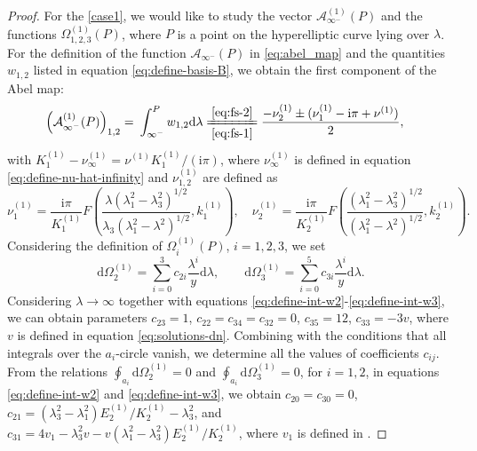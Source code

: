 \documentclass[11pt,reqno]{amsart}
\newcommand{\ii}{\mathrm{i}}
\newcommand{\dd}{\mathrm{d}}
\numberwithin{equation}{section}
\begin{document}
\begin{proof}
	For the \ref{case1}, we would like to study the vector $\mathcal{A}_{\infty^{-}}^{(1)}(P)$ and the functions $\Omega_{1,2,3}^{(1)}(P)$, where $P$ is a point on the hyperelliptic curve lying over $\lambda$.
	For the definition of the function $\mathcal{A}_{\infty^{-}}(P)$ in \eqref{eq:abel_map} and the quantities $w_{1,2}$ listed in equation \eqref{eq:define-basis-B}, we obtain the first component of the Abel map:
	\begin{equation}\label{eq:define-AP-P}
		\begin{split}
			\left(\mathcal{A}^{(1)}_{\infty^{-}}(P)\right)_{1,2}=&\ \int_{\infty^{-}}^P w_{1,2} \dd \lambda 
			\xlongequal[\eqref{eq:fs-1}]{\eqref{eq:fs-2}}
			\frac{ -\nu^{(1)} _2\pm(\nu^{(1)} _1-\ii\pi+ \nu^{(1)}) }{2},
		\end{split}
	\end{equation}
	with $K^{(1)}_1-\nu^{(1)}_{\infty}= \nu^{(1)} K^{(1)}_1/(\ii \pi)$,
	where $ \nu^{(1)} _{\infty}$ is defined in equation \eqref{eq:define-nu-hat-infinity} and $ \nu^{(1)} _{1,2}$ are defined as 
	\begin{equation}\label{eq:define-nu-1-12}\nonumber
		\nu^{(1)} _1=\frac{\ii\pi }{  K^{(1)}_1} F\left(\frac{\lambda(\lambda_1^2-\lambda_3^2)^{1/2}}{\lambda_3(\lambda_1^2-\lambda^2)^{1/2}},  k^{(1)}_1\right), \quad 
		\nu^{(1)} _2=\frac{\ii \pi }{  K^{(1)}_2} F\left(\frac{(\lambda_1^2-\lambda_3^2)^{1/2}}{(\lambda_1^2-\lambda^2)^{1/2}},  k^{(1)}_2\right).
	\end{equation}
	Considering the definition of $\Omega_{i}^{(1)}(P)$, $i=1,2,3$, we set 
	\begin{equation}\label{eq:define-Omega-23-c}
		\dd\Omega_2^{(1)}=\sum_{i=0}^3c_{2i}\frac{\lambda^i}{y}\dd \lambda,
		\qquad 
		\dd\Omega_3^{(1)}=\sum_{i=0}^5 c_{3i}\frac{\lambda^i}{y}\dd \lambda.
	\end{equation}
	Considering $\lambda \rightarrow \infty$ together with equations \eqref{eq:define-int-w2}-\eqref{eq:define-int-w3}, we can obtain parameters $c_{23}=1$, $c_{22}=c_{34}=c_{32}=0$, $c_{35}=12$, $c_{33}=-3v$, where $v$ is defined in equation \eqref{eq:solutions-dn}.
	Combining with the conditions that all integrals over the $a_i$-circle vanish, 
	we determine all the values of coefficients $c_{ij}$.
	From the relations $\oint_{a_i}\dd \Omega_2^{(1)}=0$ and $\oint_{a_i}\dd \Omega_3^{(1)}=0$, for $i=1,2$, in equations \eqref{eq:define-int-w2} and \eqref{eq:define-int-w3}, we obtain $c_{20}=c_{30}=0$, $c_{21}=(\lambda_3^2-\lambda_1^2) E^{(1)}_2/  K^{(1)}_2-\lambda_3^2$, and $c_{31}=4v_1-\lambda_3^2v-v(\lambda_1^2-\lambda_3^2) E^{(1)}_2/  K^{(1)}_2$,  where $v_1$ is defined in .

\end{proof}
\end{document}

